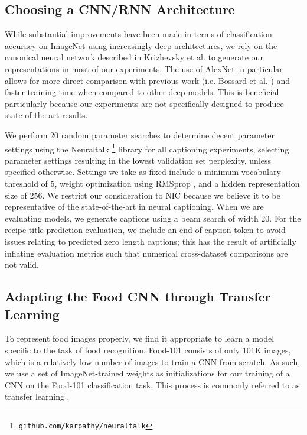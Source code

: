 \documentclass[11pt]{article}
\begin{document}
\subsection{Choosing a CNN/RNN Architecture}

While substantial improvements have been made in terms of
classification accuracy on ImageNet using increasingly deep
architectures, we rely on the canonical neural network described in
Krizhevsky et al.  to generate our representations
in most of our experiments. The use of AlexNet in particular allows
for more direct comparison with previous work (i.e. Bossard et
al. ) and faster training time when compared to
other deep models. This is beneficial particularly because our
experiments are not specifically designed to produce state-of-the-art
results.

We perform 20 random parameter searches to determine decent parameter
settings using the Neuraltalk
\footnote{{\tt github.com/karpathy/neuraltalk}} library for all
captioning experiments, selecting parameter settings resulting in the
lowest validation set perplexity, unless specified otherwise. Settings
we take as fixed include a minimum vocabulary threshold of 5, weight
optimization using RMSprop \cite{tieleman2012lecture}, and a hidden
representation size of 256. We restrict our consideration to NIC
because we believe it to be representative of the state-of-the-art in
neural captioning. When we are evaluating models, we generate captions
using a beam search of width 20. For the recipe title prediction
evaluation, we include an end-of-caption token to avoid issues
relating to predicted zero length captions; this has the result of
artificially inflating evaluation metrics such that numerical
cross-dataset comparisons are not valid.

\subsection{Adapting the Food CNN through Transfer Learning}
To represent food images properly, we find it appropriate to learn a
model specific to the task of food recognition. Food-101
\cite{bossard14} consists of only 101K images, which is a relatively
low number of images to train a CNN from scratch. As such, we use a
set of ImageNet-trained weights as initializations for our training of
a CNN on the Food-101 classification task. This process is commonly
referred to as transfer learning
\cite{caruana1995learning,bengio2012deep}.
\end{document}

